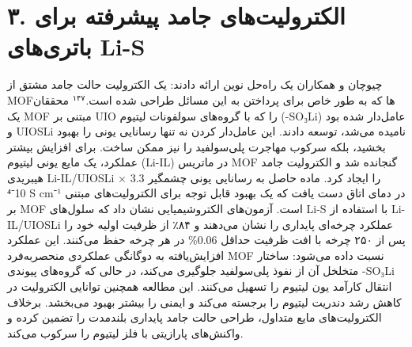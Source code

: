 \documentclass[12pt,a4paper,twocolumn]{article} %
\newcommand{\persian}[1]{\textfarsi{#1}}
\newcommand{\english}[1]{\textenglish{#1}}
\begin{document}
\section*{\persian{۳. الکترولیت‌های جامد پیشرفته برای باتری‌های \english{Li-S}}}
\persian{
چیوچان و همکاران یک راه‌حل نوین ارائه دادند: یک الکترولیت حالت جامد مشتق از \english{MOF}ها که به طور خاص برای پرداختن به این مسائل طراحی شده است.$^{۱۴۷}$ محققان یک \english{MOF} مبتنی بر \english{UIO} را که با گروه‌های سولفونات لیتیوم (\english{-SO₃Li}) عامل‌دار شده بود و \english{UIOSLi} نامیده می‌شد، توسعه دادند. این عامل‌دار کردن نه تنها رسانایی یونی را بهبود بخشید، بلکه سرکوب مهاجرت پلی‌سولفید را نیز ممکن ساخت. برای افزایش بیشتر عملکرد، یک مایع یونی لیتیوم (\english{Li-IL}) در ماتریس \english{MOF} گنجانده شد و الکترولیت جامد هیبریدی \english{Li-IL/UIOSLi} را ایجاد کرد. ماده حاصل به رسانایی یونی چشمگیر \english{3.3 × 10⁻⁴ S cm⁻¹} در دمای اتاق دست یافت که یک بهبود قابل توجه برای الکترولیت‌های مبتنی بر \english{MOF} است. آزمون‌های الکتروشیمیایی نشان داد که سلول‌های \english{Li-S} با استفاده از \english{Li-IL/UIOSLi} عملکرد چرخه‌ای پایداری را نشان می‌دهند و ۸۴٪ از ظرفیت اولیه خود را پس از ۲۵۰ چرخه با افت ظرفیت حداقل \english{0.06\%} در هر چرخه حفظ می‌کنند. این عملکرد افزایش‌یافته به دوگانگی عملکردی منحصربه‌فرد \english{MOF} نسبت داده می‌شود: ساختار متخلخل آن از نفوذ پلی‌سولفید جلوگیری می‌کند، در حالی که گروه‌های پیوندی \english{-SO₃Li} انتقال کارآمد یون لیتیوم را تسهیل می‌کنند. این مطالعه همچنین توانایی الکترولیت در کاهش رشد دندریت لیتیوم را برجسته می‌کند و ایمنی را بیشتر بهبود می‌بخشد. برخلاف الکترولیت‌های مایع متداول، طراحی حالت جامد پایداری بلندمدت را تضمین کرده و واکنش‌های پارازیتی با فلز لیتیوم را سرکوب می‌کند.
}
\end{document}
